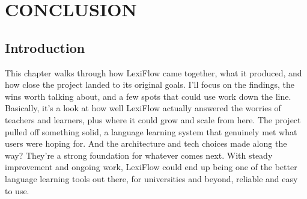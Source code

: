 \chapter{CONCLUSION}
\section{Introduction}This chapter walks through how LexiFlow came together, what it produced, and how close the project landed to its original goals. I'll focus on the findings, the wins worth talking about, and a few spots that could use work down the line. Basically, it's a look at how well LexiFlow actually answered the worries of teachers and learners, plus where it could grow and scale from here. The project pulled off something solid, a language learning system that genuinely met what users were hoping for. And the architecture and tech choices made along the way? They're a strong foundation for whatever comes next. With steady improvement and ongoing work, LexiFlow could end up being one of the better language learning tools out there, for universities and beyond, reliable and easy to use.
